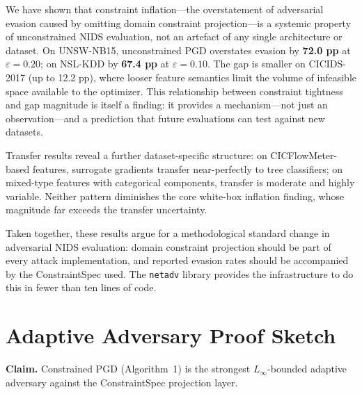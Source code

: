 \documentclass[sigconf,anonymous=true]{acmart}
\begin{document}
We have shown that constraint inflation---the overstatement of
adversarial evasion caused by omitting domain constraint projection---is
a systemic property of unconstrained NIDS evaluation, not an artefact
of any single architecture or dataset.
On UNSW-NB15, unconstrained PGD overstates evasion by \textbf{72.0 pp}
at $\varepsilon=0.20$; on NSL-KDD by \textbf{67.4 pp} at $\varepsilon=0.10$.
The gap is smaller on CICIDS-2017 (up to 12.2 pp), where looser feature
semantics limit the volume of infeasible space available to the optimizer.
This relationship between constraint tightness and gap magnitude is itself
a finding: it provides a mechanism---not just an observation---and a
prediction that future evaluations can test against new datasets.

Transfer results reveal a further dataset-specific structure: on
CICFlowMeter-based features, surrogate gradients transfer near-perfectly
to tree classifiers; on mixed-type features with categorical components,
transfer is moderate and highly variable.
Neither pattern diminishes the core white-box inflation finding, whose
magnitude far exceeds the transfer uncertainty.

Taken together, these results argue for a methodological standard change
in adversarial NIDS evaluation: domain constraint projection should be
part of every attack implementation, and reported evasion rates should
be accompanied by the ConstraintSpec used.  The \texttt{netadv} library
provides the infrastructure to do this in fewer than ten lines of code.

\begin{acks}
\end{acks}




\appendix

\section{Adaptive Adversary Proof Sketch}
\label{app:adaptive}

\textbf{Claim.} Constrained PGD (Algorithm~1) is the
strongest $L_\infty$-bounded adaptive adversary against the
ConstraintSpec projection layer.
\end{document}
